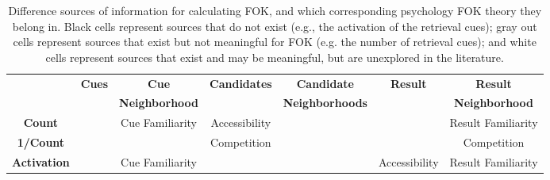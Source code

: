 \documentclass[10pt,letterpaper]{article}
\newcommand{\tableheader}[1]{\multirow{2}{*}{\textbf{#1}}}
\newcommand{\whitecell}[0]{}
\newcommand{\graycell}[0]{\cellcolor{gray!70}}
\newcommand{\blackcell}[0]{\cellcolor{black}}
\begin{document}
\begin{table*}[ht]
\begin{tabular}{c|cccccc}
\whitecell           &  \tableheader{Cues}  &  \textbf{Cue}           &  \tableheader{Candidates}  &  \textbf{Candidate}      &  \tableheader{Result}  &  \textbf{Result}        \\  
\whitecell           &  \whitecell          &  \textbf{Neighborhood}  &  \whitecell                &  \textbf{Neighborhoods}  &  \whitecell            &  \textbf{Neighborhood}  \\  
\hline                                                                                                                                                                               
\textbf{Count}       &  \graycell           &  Cue Familiarity        &  Accessibility             &  \whitecell              &  \graycell             &  Result Familiarity     \\  
\textbf{1/Count}     &  \graycell           &  \whitecell             &  Competition               &  \whitecell              &  \graycell             &  Competition            \\  
\textbf{Activation}  &  \blackcell          &  Cue Familiarity        &  \whitecell                &  \whitecell              &  Accessibility         &  Result Familiarity     \\  
\end{tabular}


\caption{
    Difference sources of information for calculating FOK, and which corresponding psychology FOK theory they belong in.
    Black cells represent sources that do not exist (e.g., the activation of the retrieval cues);
    gray out cells represent sources that exist but not meaningful for FOK (e.g. the number of retrieval cues);
    and white cells represent sources that exist and may be meaningful, but are unexplored in the literature.
}
\label{determinants}
\end{table*}
\end{document}
